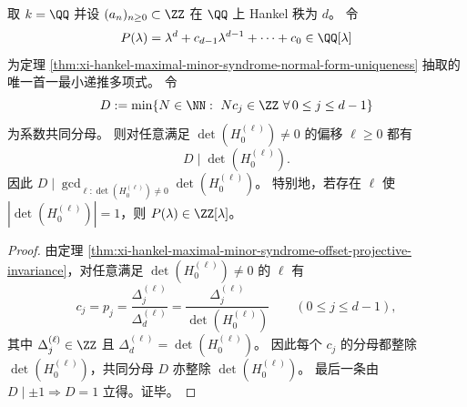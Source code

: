 \begin{corollary}\label{cor:xi-hankel-recurrence-common-denominator-divides-determinants}
取 \(k=\QQ\) 并设 \((a_n)_{n\ge 0}\subset\ZZ\) 在 \(\QQ\) 上 Hankel 秩为 \(d\)。
令
\[
P(\lambda)=\lambda^d+c_{d-1}\lambda^{d-1}+\cdots+c_0\in\QQ[\lambda]
\]
为定理 \ref{thm:xi-hankel-maximal-minor-syndrome-normal-form-uniqueness} 抽取的唯一首一最小递推多项式。
令
\[
D:=\min\{N\in\NN:\ Nc_j\in\ZZ\ \forall\,0\le j\le d-1\}
\]
为系数共同分母。
则对任意满足 \(\det(H_0^{(\ell)})\neq 0\) 的偏移 \(\ell\ge 0\) 都有
\[
D\mid \det(H_0^{(\ell)}).
\]
因此 \(D\mid \gcd_{\ell:\det(H_0^{(\ell)})\neq 0}\det(H_0^{(\ell)})\)。
特别地，若存在 \(\ell\) 使 \(|\det(H_0^{(\ell)})|=1\)，则 \(P(\lambda)\in\ZZ[\lambda]\)。
\end{corollary}

\begin{proof}
由定理 \ref{thm:xi-hankel-maximal-minor-syndrome-offset-projective-invariance}，对任意满足 \(\det(H_0^{(\ell)})\neq 0\) 的 \(\ell\) 有
\[
c_j=p_j=\frac{\Delta_j^{(\ell)}}{\Delta_d^{(\ell)}}=\frac{\Delta_j^{(\ell)}}{\det(H_0^{(\ell)})}\qquad(0\le j\le d-1),
\]
其中 \(\Delta_j^{(\ell)}\in\ZZ\) 且 \(\Delta_d^{(\ell)}=\det(H_0^{(\ell)})\)。
因此每个 \(c_j\) 的分母都整除 \(\det(H_0^{(\ell)})\)，共同分母 \(D\) 亦整除 \(\det(H_0^{(\ell)})\)。
最后一条由 \(D\mid \pm 1\Rightarrow D=1\) 立得。证毕。
\end{proof}

